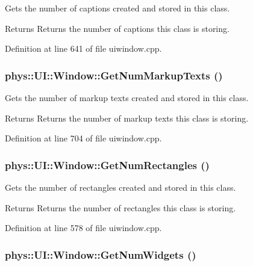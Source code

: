 Gets the number of captions created and stored in this class. 

\begin{DoxyReturn}{Returns}
Returns the number of captions this class is storing. 
\end{DoxyReturn}


Definition at line 641 of file uiwindow.cpp.

\hypertarget{classphys_1_1UI_1_1Window_ac9e23e41ffff8ef475fcdb0c25bad240}{
\subsubsection[{GetNumMarkupTexts}]{ phys::UI::Window::GetNumMarkupTexts ()}}
\label{d4/d86/classphys_1_1UI_1_1Window_ac9e23e41ffff8ef475fcdb0c25bad240}


Gets the number of markup texts created and stored in this class. 

\begin{DoxyReturn}{Returns}
Returns the number of markup texts this class is storing. 
\end{DoxyReturn}


Definition at line 704 of file uiwindow.cpp.

\hypertarget{classphys_1_1UI_1_1Window_a4d2d8821df32a920e7389b37f50f7c6d}{
\subsubsection[{GetNumRectangles}]{ phys::UI::Window::GetNumRectangles ()}}
\label{d4/d86/classphys_1_1UI_1_1Window_a4d2d8821df32a920e7389b37f50f7c6d}


Gets the number of rectangles created and stored in this class. 

\begin{DoxyReturn}{Returns}
Returns the number of rectangles this class is storing. 
\end{DoxyReturn}


Definition at line 578 of file uiwindow.cpp.

\hypertarget{classphys_1_1UI_1_1Window_a062270984d25dca44f0bc4d65ef324a0}{
\subsubsection[{GetNumWidgets}]{ phys::UI::Window::GetNumWidgets ()}}
\label{d4/d86/classphys_1_1UI_1_1Window_a062270984d25dca44f0bc4d65ef324a0}


